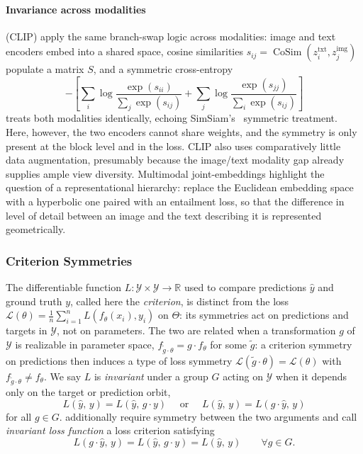 \documentclass[mathematics,review,submit,moreauthors]{Definitions/mdpi}
\begin{document}
\paragraph{Invariance across modalities}
\citet{radford2021p3icml} (CLIP) apply the same branch-swap logic across modalities: image and text encoders embed into a shared space, cosine similarities $s_{ij}=\operatorname{CoSim}(z_i^{\mathrm{txt}},z_j^{\mathrm{img}})$ populate a matrix $S$, and a symmetric cross-entropy
\[
-\left[\sum_i\log\frac{\exp(s_{ii})}{\sum_j\exp(s_{ij})}+\sum_j\log\frac{\exp(s_{jj})}{\sum_i\exp(s_{ij})}\right]
\]
treats both modalities identically, echoing SimSiam's~\citep{chen2020a} symmetric treatment.
Here, however, the two encoders cannot share weights, and the symmetry is only present at the block level and in the loss.
CLIP also uses comparatively little data augmentation, presumably because the image/text modality gap already supplies ample view diversity.
Multimodal joint-embeddings highlight the question of a representational hierarchy: \citet{desai2023p4icml} replace the Euclidean embedding space with a hyperbolic one paired with an entailment loss, so that the difference in level of detail between an image and the text describing it is represented geometrically.

\subsubsection{Criterion Symmetries}\label{sec:criterion-symmetries}
The differentiable function $L:\mathcal{Y}\times\mathcal{Y}\to\mathbb{R}$ used to compare predictions $\hat y$ and ground truth $y$, called here the \emph{criterion}, is distinct from the loss $\mathcal{L}(\theta)=\frac{1}{n}\sum_{i=1}^{n} L(f_\theta(x_i),y_i)$ on $\Theta$: its symmetries act on predictions and targets in $\mathcal{Y}$, not on parameters.
The two are related when a transformation $g$ of $\mathcal{Y}$ is realizable in parameter space, $f_{\tilde g\cdot\theta}=g\cdot f_\theta$ for some $\tilde g$: a criterion symmetry on predictions then induces a type of loss symmetry $\mathcal{L}(\tilde g\cdot\theta)=\mathcal{L}(\theta)$ with $f_{\tilde g\cdot\theta}\neq f_\theta$.
We say $L$ is \emph{invariant} under a group $G$ acting on $\mathcal{Y}$ when it depends only on the target or prediction orbit,
$$
L(\hat y,\, y) = L(\hat y,\, g\cdot y) \quad \text{ or } \quad L(\hat y,\, y) = L(g\cdot \hat y,\, y)
$$
for all $g\in G$.
\citet{kaba2025anips} additionally require symmetry between the two arguments and call \emph{invariant loss function} a loss criterion satisfying
\begin{equation}\label{eq:invariant-loss}
    L(g\cdot\hat y,\, y) = L(\hat y,\, g\cdot y) = L(\hat y,\, y) \qquad \forall g\in G.
\end{equation}
\end{document}
